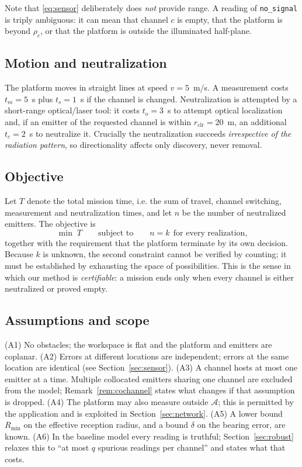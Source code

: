 \documentclass[journal,10pt]{IEEEtran}
\theoremstyle{definition}
\newcommand{\Rmin}{R_{\min}}
\newcommand{\bA}{\mathcal{A}}
\begin{document}
Note that \eqref{eq:sensor} deliberately does \emph{not} provide range. A reading of
\texttt{no\_signal} is triply ambiguous: it can mean that channel $c$ is empty, that the platform
is beyond $\rho_c$, or that the platform is outside the illuminated half-plane.

\subsection{Motion and neutralization}
The platform moves in straight lines at speed $v=5$~m/s. A measurement costs $t_m=5$~s plus
$t_s=1$~s if the channel is changed. Neutralization is attempted by a short-range optical/laser
tool: it costs $t_o=3$~s to attempt optical localization and, if an emitter of the requested
channel is within $r_{\mathrm{clr}}=20$~m, an additional $t_c=2$~s to neutralize it. Crucially the
neutralization succeeds \emph{irrespective of the radiation pattern}, so directionality affects
only discovery, never removal.

\subsection{Objective}
Let $T$ denote the total mission time, i.e. the sum of travel, channel switching, measurement and
neutralization times, and let $n$ be the number of neutralized emitters. The objective is
\begin{equation}
\min \; T \qquad\text{subject to}\qquad n=k\ \ \text{for every realization,}
\label{eq:objective}
\end{equation}
together with the requirement that the platform terminate by its own decision. Because $k$ is
unknown, the second constraint cannot be verified by counting; it must be established by
exhausting the space of possibilities. This is the sense in which our method is \emph{certifiable}:
a mission ends only when every channel is either neutralized or proved empty.

\subsection{Assumptions and scope}
(A1) No obstacles; the workspace is flat and the platform and emitters are coplanar.
(A2) Errors at different locations are independent; errors at the same location are identical
(see Section~\ref{sec:sensor}).
(A3) A channel hosts at most one emitter at a time. Multiple collocated emitters sharing one
channel are excluded from the model; Remark~\ref{rem:cochannel} states what changes if that
assumption is dropped.
(A4) The platform may also measure outside $\bA$; this is permitted by the application and is
exploited in Section~\ref{sec:network}.
(A5) A lower bound $\Rmin$ on the effective reception radius, and a bound $\delta$ on the bearing
error, are known.
(A6) In the baseline model every reading is truthful; Section~\ref{sec:robust} relaxes this to
``at most $q$ spurious readings per channel'' and states what that costs.
\end{document}
